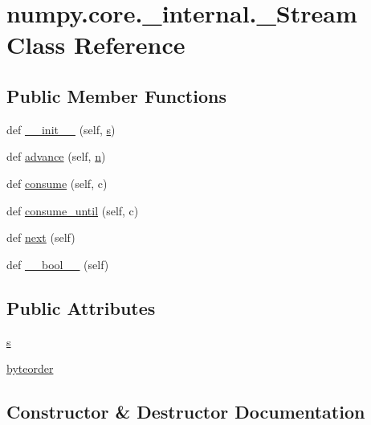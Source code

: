 \hypertarget{classnumpy_1_1core_1_1__internal_1_1__Stream}{}\section{numpy.\+core.\+\_\+internal.\+\_\+\+Stream Class Reference}
\label{classnumpy_1_1core_1_1__internal_1_1__Stream}
\subsection*{Public Member Functions}
\begin{DoxyCompactItemize}
\item 
def \hyperlink{classnumpy_1_1core_1_1__internal_1_1__Stream_a49f9e8bec41226a94506e6a92873324e}{\+\_\+\+\_\+init\+\_\+\+\_\+} (self, \hyperlink{classnumpy_1_1core_1_1__internal_1_1__Stream_a3993723cd895aebd46025aab8b023725}{s})
\item 
def \hyperlink{classnumpy_1_1core_1_1__internal_1_1__Stream_a3a65185f483d7383cafd0cec8611be96}{advance} (self, \hyperlink{namespacenumpy_a352663c52853d2754274407d5cae2832}{n})
\item 
def \hyperlink{classnumpy_1_1core_1_1__internal_1_1__Stream_ad4c7970d072eeaeaac02fd5f38e77d7c}{consume} (self, c)
\item 
def \hyperlink{classnumpy_1_1core_1_1__internal_1_1__Stream_a38d5bef8f08099937b2e4d5ebfb580b9}{consume\+\_\+until} (self, c)
\item 
def \hyperlink{classnumpy_1_1core_1_1__internal_1_1__Stream_a31cef5a1c7530c83e7425cfdfd56d331}{next} (self)
\item 
def \hyperlink{classnumpy_1_1core_1_1__internal_1_1__Stream_a26d2fea00b255ce91778e751023b156d}{\+\_\+\+\_\+bool\+\_\+\+\_\+} (self)
\end{DoxyCompactItemize}
\subsection*{Public Attributes}
\begin{DoxyCompactItemize}
\item 
\hyperlink{classnumpy_1_1core_1_1__internal_1_1__Stream_a3993723cd895aebd46025aab8b023725}{s}
\item 
\hyperlink{classnumpy_1_1core_1_1__internal_1_1__Stream_a859c3e83e83047f2b851e92aa07e77bb}{byteorder}
\end{DoxyCompactItemize}


\subsection{Constructor \& Destructor Documentation}
\mbox{\label{classnumpy_1_1core_1_1__internal_1_1__Stream_a49f9e8bec41226a94506e6a92873324e}} 
